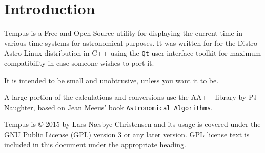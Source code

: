\section{Introduction}
Tempus is a Free and Open Source utility for displaying the current time in various time systems for astronomical purposes. It was written for for the Distro Astro Linux distribution in C++ using the \texttt{Qt} user interface toolkit for maximum compatibility in case someone wishes to port it.

It is intended to be small and unobtrusive, unless you want it to be.

A large portion of the calculations and conversions use the AA++ library by PJ Naughter, based on Jean Meeus' book \texttt{Astronomical Algorithms}.

Tempus is {\copyright} 2015 by Lars N{\ae}sbye Christensen and its usage is covered under the GNU Public License (GPL) version 3 or any later version. GPL license text is included in this document under the appropriate heading.

